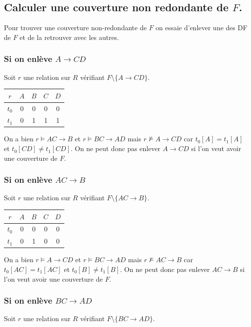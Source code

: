 \documentclass[10pt,a4paper,twoside]{article}
\begin{document}
\subsection{Calculer une couverture non redondante de $F$.}
Pour trouver une couverture non-redondante de $F$ on essaie d'enlever une des DF de $F$ et de la retrouver avec les autres.
\subsubsection{Si on enlève $A\rightarrow CD$}
Soit $r$ une relation sur $R$ vérifiant $F\setminus \{A \rightarrow CD\}$.

\begin{tabular}{c|cccc}
$r$ & $A$ & $B$ & $C$ & $D$ \\ 
\hline 
$t_{0}$ & 0 & 0 & 0 & 0 \\ 
$t_{1}$ & 0 & 1 & 1 & 1 \\ 
\end{tabular} 

On a bien $r \models AC \rightarrow B$ et $r \models BC \rightarrow AD$ mais $r \not\models A \rightarrow CD$ car $t_{0}[A] = t_{1}[A]$ et $t_{0}[CD] \neq t_{1}[CD]$. On ne peut donc pas enlever $A\rightarrow CD$ si l'on veut avoir une couverture de $F$.

\subsubsection{Si on enlève $AC \rightarrow B$}
Soit $r$ une relation sur $R$ vérifiant $F\setminus \{AC \rightarrow B\}$.

\begin{tabular}{c|cccc}
$r$ & $A$ & $B$ & $C$ & $D$ \\ 
\hline 
$t_{0}$ & 0 & 0 & 0 & 0 \\ 
$t_{1}$ & 0 & 1 & 0 & 0 \\ 
\end{tabular}

On a bien $r \models A \rightarrow CD$ et $r \models BC \rightarrow AD$ mais $r \not\models AC \rightarrow B$ car $t_{0}[AC] = t_{1}[AC]$ et $t_{0}[B] \neq t_{1}[B]$. On ne peut donc pas enlever $AC\rightarrow B$ si l'on veut avoir une couverture de $F$.

\subsubsection{Si on enlève $BC \rightarrow AD$}
Soit $r$ une relation sur $R$ vérifiant $F\setminus \{BC \rightarrow AD\}$.
\end{document}
